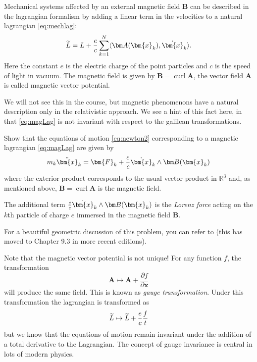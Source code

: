 \documentclass[english,fontsize=11pt,paper=a5,oneside]{scrbook}
\newcommand{\R}{\mathbb{R}}
\newcommand{\bx}{\bm{x}}
\newcommand{\lag}{\langle}
\newcommand{\rag}{\rangle}
\let\d\relax
\DeclareMathOperator{\d}{d}
\DeclareMathOperator{\curl}{curl}
\theoremstyle{definition}
\newenvironment{example}
  {\pushQED{\qed}\renewcommand{\qedsymbol}{$\lozenge$}\examplex}
  {\popQED\endexamplex}
\newenvironment{exercise}
  {\pushQED{\qed}\renewcommand{\qedsymbol}{$\maltese$}\exercisex}
  {\popQED\endexercisex}
\begin{document}
\begin{example}\label{exa:magnetic}
    Mechanical systems affected by an external magnetic field $\bm B$ can be described in the lagrangian formalism by adding a linear term in the velocities to a natural lagrangian \eqref{eq:mechlag}:
    \begin{equation}\label{eq:magLag}
        \widetilde L = L + \frac ec \sum_{k=1}^N \lag\bm A(\bx_k), \dot \bx_k\rag.
    \end{equation}
    Here the constant $e$ is the electric charge of the point particles and $c$ is the speed of light in vacuum.
    The magnetic field is given by $\bm B = \curl \bm A$, the vector field $\bm A$ is called magnetic vector potential.
    
    We will not see this in the course, but magnetic phenomenons have a natural description only in the relativistic approach. We see a hint of this fact here, in that \eqref{eq:magLag} is not invariant with respect to the galilean transformations.
    
    \begin{exercise}\label{exe:magnetic}
        Show that the equations of motion \eqref{eq:newton2} corresponding to a magnetic lagrangian \eqref{eq:magLag} are given by
        \begin{equation}
            m_k \ddot\bx_k = \bm{F}_k + \frac ec \dot\bx_k \wedge \bm B(\bx_k)
        \end{equation}
        where the exterior product corresponds to the usual vector product in $\R^3$ and, as mentioned above, $\bm B = \curl \bm A$ is the magnetic field.

        The additional term $\frac ec \dot\bx_k\wedge \bm B(\bx_k)$ is the \emph{Lorenz force} acting on the $k$th particle of charge $e$ immersed in the magnetic field $\bm B$.

        For a beautiful geometric discussion of this problem, you can refer to \cite[Chapter 8.3]{book:amr} (this has moved to Chapter 9.3 in more recent editions).
    \end{exercise}
    
    Note that the magnetic vector potential is not unique!
    For any function $f$, the transformation
    \begin{equation}
        \bm A \mapsto \bm A + \frac{\partial f}{\partial \bx}
    \end{equation}
    will produce the same field.
    This is known as \emph{gauge transformation}.
    Under this transformation the lagrangian is transformed as
    \begin{equation}
        \widetilde L \mapsto \widetilde L + \frac{e}{c} \frac{\d f}{\d t}
    \end{equation}
    but we know that the equations of motion remain invariant under the addition of a total derivative to the Lagrangian.
    The concept of gauge invariance is central in lots of modern physics.
\end{example}
\end{document}
